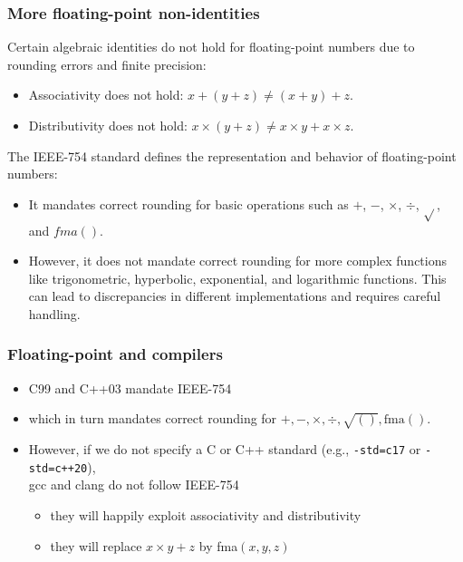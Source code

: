 \documentclass[12pt]{article}
\begin{document}
\subsubsection{More floating-point non-identities}
Certain algebraic identities do not hold for floating-point numbers due to rounding errors and finite precision:
\begin{itemize}
    \item Associativity does not hold: \( x + (y + z) \neq (x + y) + z \).
    \item Distributivity does not hold: \( x \times (y + z) \neq x \times y + x \times z \).
\end{itemize}


The IEEE-754 standard defines the representation and behavior of floating-point numbers:

\begin{itemize}
    \item It mandates correct rounding for basic operations such as \( + \), \( - \), \( \times \), \( \div \), \( \sqrt{} \), and \( fma() \).
    \item However, it does not mandate correct rounding for more complex functions like trigonometric, hyperbolic, exponential, and logarithmic functions. This can lead to discrepancies in different implementations and requires careful handling.
\end{itemize}

\subsubsection{Floating-point and compilers}

\begin{itemize}
  \item C99 and C++03 mandate IEEE-754
  \item which in turn mandates correct rounding for $+, -, \times, \div, \sqrt{()}, \text{fma}()$.
  \item However, if we do not specify a C or C++ standard (e.g., \texttt{-std=c17} or \texttt{-std=c++20}), \\
  gcc and clang do not follow IEEE-754
  \begin{itemize}
    \item they will happily exploit associativity and distributivity
    \item they will replace $x \times y + z$ by fma$(x, y, z)$
  \end{itemize}
\end{itemize}
\end{document}
